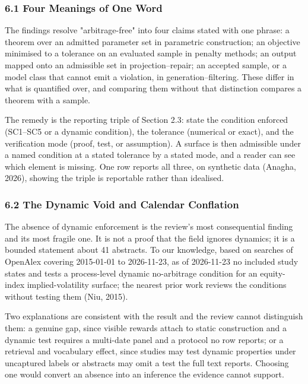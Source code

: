 \documentclass[11pt]{article}
\begin{document}
\subsubsection*{6.1 Four Meanings of One Word}
The findings resolve "arbitrage-free" into four claims stated with one phrase: a theorem over an admitted parameter set in parametric construction; an objective minimised to a tolerance on an evaluated sample in penalty methods; an output mapped onto an admissible set in projection–repair; an accepted sample, or a model class that cannot emit a violation, in generation–filtering. These differ in what is quantified over, and comparing them without that distinction compares a theorem with a sample.

The remedy is the reporting triple of Section 2.3: state the condition enforced (SC1–SC5 or a dynamic condition), the tolerance (numerical or exact), and the verification mode (proof, test, or assumption). A surface is then admissible under a named condition at a stated tolerance by a stated mode, and a reader can see which element is missing. One row reports all three, on synthetic data (Anagha, 2026), showing the triple is reportable rather than idealised.

\subsubsection*{6.2 The Dynamic Void and Calendar Conflation}
The absence of dynamic enforcement is the review's most consequential finding and its most fragile one. It is not a proof that the field ignores dynamics; it is a bounded statement about 41 abstracts. To our knowledge, based on searches of OpenAlex covering 2015-01-01 to 2026-11-23, as of 2026-11-23 no included study states and tests a process-level dynamic no-arbitrage condition for an equity-index implied-volatility surface; the nearest prior work reviews the conditions without testing them (Niu, 2015).

Two explanations are consistent with the result and the review cannot distinguish them: a genuine gap, since visible rewards attach to static construction and a dynamic test requires a multi-date panel and a protocol no row reports; or a retrieval and vocabulary effect, since studies may test dynamic properties under uncaptured labels or abstracts may omit a test the full text reports. Choosing one would convert an absence into an inference the evidence cannot support.
\end{document}

